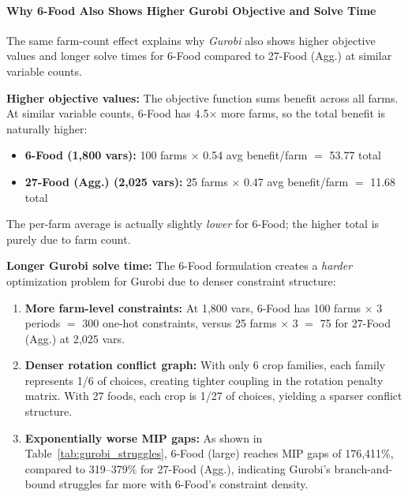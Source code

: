\paragraph{Why 6-Food Also Shows Higher Gurobi Objective and Solve Time}

The same farm-count effect explains why \emph{Gurobi} also shows higher objective values and longer solve times for 6-Food compared to 27-Food (Agg.) at similar variable counts.

\textbf{Higher objective values:} The objective function sums benefit across all farms. At similar variable counts, 6-Food has 4.5$\times$ more farms, so the total benefit is naturally higher:
\begin{itemize}
    \item \textbf{6-Food (1,800 vars):} 100 farms $\times$ 0.54 avg benefit/farm $=$ 53.77 total
    \item \textbf{27-Food (Agg.) (2,025 vars):} 25 farms $\times$ 0.47 avg benefit/farm $=$ 11.68 total
\end{itemize}
The per-farm average is actually slightly \emph{lower} for 6-Food; the higher total is purely due to farm count.

\textbf{Longer Gurobi solve time:} The 6-Food formulation creates a \emph{harder} optimization problem for Gurobi due to denser constraint structure:
\begin{enumerate}
    \item \textbf{More farm-level constraints:} At 1,800 vars, 6-Food has 100 farms $\times$ 3 periods $=$ 300 one-hot constraints, versus 25 farms $\times$ 3 $=$ 75 for 27-Food (Agg.) at 2,025 vars.
    \item \textbf{Denser rotation conflict graph:} With only 6 crop families, each family represents 1/6 of choices, creating tighter coupling in the rotation penalty matrix. With 27 foods, each crop is 1/27 of choices, yielding a sparser conflict structure.
    \item \textbf{Exponentially worse MIP gaps:} As shown in Table~\ref{tab:gurobi_struggles}, 6-Food (large) reaches MIP gaps of 176,411\%, compared to 319--379\% for 27-Food (Agg.), indicating Gurobi's branch-and-bound struggles far more with 6-Food's constraint density.
\end{enumerate}


